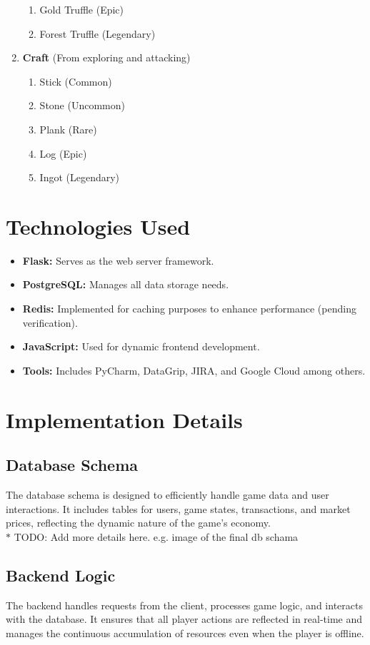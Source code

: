\documentclass[12pt]{article}
\begin{document}
\begin{enumerate}
\begin{enumerate}
        \item Gold Truffle (Epic)
        \item Forest Truffle (Legendary)
    \end{enumerate}
    \item \textbf{Craft} (From exploring and attacking)
    \begin{enumerate}
        \item Stick (Common)
        \item Stone (Uncommon)
        \item Plank (Rare)
        \item Log (Epic)
        \item Ingot (Legendary)
    \end{enumerate}
\end{enumerate}

\section{Technologies Used}
\begin{itemize}
    \item \textbf{Flask:} Serves as the web server framework.
    \item \textbf{PostgreSQL:} Manages all data storage needs.
    \item \textbf{Redis:} Implemented for caching purposes to enhance performance (pending verification).
    \item \textbf{JavaScript:} Used for dynamic frontend development.
    \item \textbf{Tools:} Includes PyCharm, DataGrip, JIRA, and Google Cloud among others.
\end{itemize}

\section{Implementation Details}
\subsection{Database Schema}
The database schema is designed to efficiently handle game data and user interactions. It includes tables for users, game states, transactions, and market prices, reflecting the dynamic nature of the game's economy.
\\ $\ast$ TODO: Add more details here. e.g. image of the final db schama

\subsection{Backend Logic}
The backend handles requests from the client, processes game logic, and interacts with the database. It ensures that all player actions are reflected in real-time and manages the continuous accumulation of resources even when the player is offline.
\end{document}
